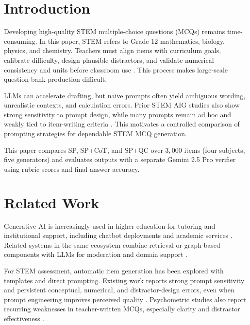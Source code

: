 ﻿\documentclass[a4paper,conference,10pt]{IEEEtran}
\begin{document}
\section{Introduction}

Developing high-quality STEM multiple-choice questions (MCQs) remains time-consuming. In this paper, STEM refers to Grade 12 mathematics, biology, physics, and chemistry. Teachers must align items with curriculum goals, calibrate difficulty, design plausible distractors, and validate numerical consistency and units before classroom use \cite{rahmah2020,ijies2023}. This process makes large-scale question-bank production difficult.

LLMs can accelerate drafting, but naive prompts often yield ambiguous wording, unrealistic contexts, and calculation errors. Prior STEM AIG studies also show strong sensitivity to prompt design, while many prompts remain ad hoc and weakly tied to item-writing criteria \cite{chan2025,acmEval1,maity2025}. This motivates a controlled comparison of prompting strategies for dependable STEM MCQ generation.

This paper compares SP, SP+CoT, and SP+QC over \(3{,}000\) items (four subjects, five generators) and evaluates outputs with a separate Gemini 2.5 Pro verifier using rubric scores and final-answer accuracy.

\section{Related Work}

Generative AI is increasingly used in higher education for tutoring and institutional support, including chatbot deployments and academic services \cite{genAIHigherEdu,muna2025siakif,acmEval2}. Related systems in the same ecosystem combine retrieval or graph-based components with LLMs for moderation and domain support \cite{hartawanLBE,lukmanLBE,nuraisyahLBE}.

For STEM assessment, automatic item generation has been explored with templates and direct prompting. Existing work reports strong prompt sensitivity and persistent conceptual, numerical, and distractor-design errors, even when prompt engineering improves perceived quality \cite{chan2025,acmEval1,maity2025,tran2023,arif2024}. Psychometric studies also report recurring weaknesses in teacher-written MCQs, especially clarity and distractor effectiveness \cite{rahmah2020,ijies2023}.
\end{document}
